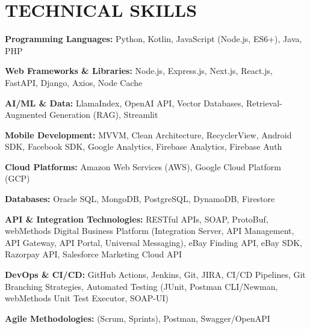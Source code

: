 \documentclass[letterpaper,11pt]{article}
\begin{document}
\section{\color{airforceblue}TECHNICAL SKILLS}
 \begin{itemize}[leftmargin=0in, label={}]
    \small{\item{
     \textbf{\normalsize{Programming Languages:}}{ \normalsize{Python, Kotlin, JavaScript (Node.js, ES6+), Java, PHP}} \\
      \vspace{1.2pt}
      
     \textbf{\normalsize{Web Frameworks \& Libraries:}}{ \normalsize{Node.js, Express.js, Next.js, React.js, FastAPI, Django, Axios, Node Cache}} \\
      \vspace{1.2pt}
      
     \textbf{\normalsize{AI/ML \& Data:}}{ \normalsize{LlamaIndex, OpenAI API, Vector Databases, Retrieval-Augmented Generation (RAG), Streamlit}} \\
      \vspace{1.2pt}
      
     \textbf{\normalsize{Mobile Development:}}{ \normalsize{MVVM, Clean Architecture, RecyclerView, Android SDK, Facebook SDK, Google Analytics, Firebase Analytics, Firebase Auth}} \\
      \vspace{1.2pt}
      
     \textbf{\normalsize{Cloud Platforms:}}{ \normalsize{Amazon Web Services (AWS), Google Cloud Platform (GCP)}} \\
      \vspace{1.2pt}
      
     \textbf{\normalsize{Databases:}}{ \normalsize{Oracle SQL, MongoDB, PostgreSQL, DynamoDB, Firestore}} \\
      \vspace{1.2pt}
      
     \textbf{\normalsize{API \& Integration Technologies:}}{ \normalsize{RESTful APIs, SOAP, ProtoBuf, webMethods Digital Business Platform (Integration Server, API Management, API Gateway, API Portal, Universal Messaging), eBay Finding API, eBay SDK, Razorpay API, Salesforce Marketing Cloud API}} \\
      \vspace{1.2pt}
      
     \textbf{\normalsize{DevOps \& CI/CD:}}{ \normalsize{GitHub Actions, Jenkins, Git, JIRA, CI/CD Pipelines, Git Branching Strategies, Automated Testing (JUnit, Postman CLI/Newman, webMethods Unit Test Executor, SOAP-UI)}} \\
      \vspace{1.2pt}
      
     \textbf{\normalsize{Agile Methodologies:}}{ \normalsize{(Scrum, Sprints), Postman, Swagger/OpenAPI}}

     }}
 \end{itemize}
 \vspace{-16pt}
 
\end{document}
